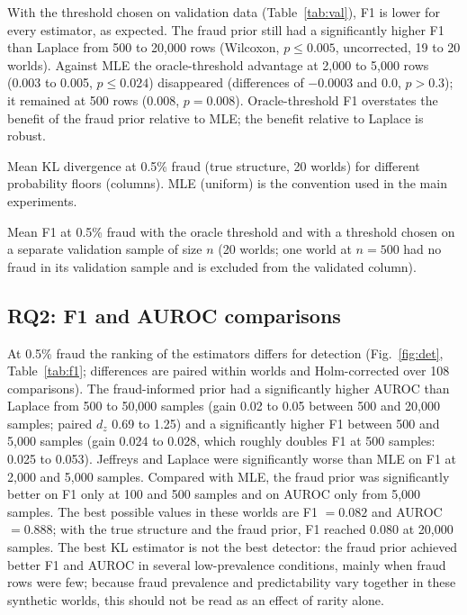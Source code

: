 \documentclass[final,5p,times,authoryear]{elsarticle}
\begin{document}
With the threshold chosen on validation data (Table~\ref{tab:val}), F1 is lower for every estimator, as expected. The fraud prior still had a significantly higher F1 than Laplace from 500 to 20,000 rows (Wilcoxon, $p\le0.005$, uncorrected, 19 to 20 worlds). Against MLE the oracle-threshold advantage at 2,000 to 5,000 rows (0.003 to 0.005, $p\le0.024$) disappeared (differences of $-0.0003$ and 0.0, $p>0.3$); it remained at 500 rows (0.008, $p=0.008$). Oracle-threshold F1 overstates the benefit of the fraud prior relative to MLE; the benefit relative to Laplace is robust.

\begin{table}[H]
\centering\small
\begin{adjustbox}{max width=\linewidth}\end{adjustbox}
\caption{Mean KL divergence at 0.5\% fraud (true structure, 20 worlds) for different probability floors (columns). MLE (uniform) is the convention used in the main experiments.}\label{tab:floor}
\end{table}

\begin{table}[H]
\centering\small
\begin{adjustbox}{max width=\linewidth}\end{adjustbox}
\caption{Mean F1 at 0.5\% fraud with the oracle threshold and with a threshold chosen on a separate validation sample of size $n$ (20 worlds; one world at $n=500$ had no fraud in its validation sample and is excluded from the validated column).}\label{tab:val}
\end{table}

\subsection{RQ2: F1 and AUROC comparisons}
At 0.5\% fraud the ranking of the estimators differs for detection (Fig.~\ref{fig:det}, Table~\ref{tab:f1}; differences are paired within worlds and Holm-corrected over 108 comparisons). The fraud-informed prior had a significantly higher AUROC than Laplace from 500 to 50,000 samples (gain 0.02 to 0.05 between 500 and 20,000 samples; paired $d_z$ 0.69 to 1.25) and a significantly higher F1 between 500 and 5,000 samples (gain 0.024 to 0.028, which roughly doubles F1 at 500 samples: 0.025 to 0.053). Jeffreys and Laplace were significantly worse than MLE on F1 at 2,000 and 5,000 samples. Compared with MLE, the fraud prior was significantly better on F1 only at 100 and 500 samples and on AUROC only from 5,000 samples. The best possible values in these worlds are F1 $=0.082$ and AUROC $=0.888$; with the true structure and the fraud prior, F1 reached 0.080 at 20,000 samples. The best KL estimator is not the best detector: the fraud prior achieved better F1 and AUROC in several low-prevalence conditions, mainly when fraud rows were few; because fraud prevalence and predictability vary together in these synthetic worlds, this should not be read as an effect of rarity alone.
\end{document}
